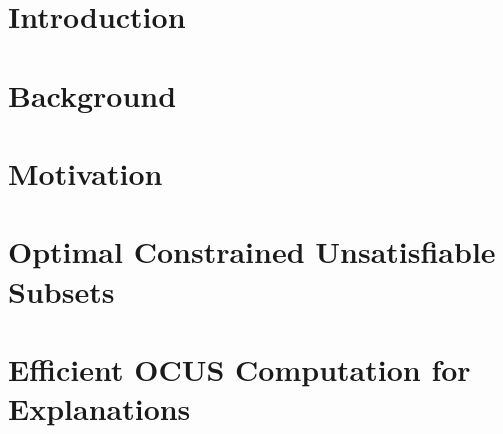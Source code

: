 \documentclass{article}
\newcommand\m[1]{\ensuremath{\mathcal{#1}}}
\newcommand\ignore[1]{}
\newcommand\comment[1]{\marginpar{\parbox{\marginparwidth}{\tiny #1}}}
\renewcommand\comment[1]{#1}
\newcommand{\todo}[1]{{\comment{\color{red}\textsc{TODO:}#1} }}
\newcommand\F{\ensuremath{\m{F} }\xspace}
\newcommand\formula{\ensuremath{\m{F} }\xspace}
\newcommand\mm[1]{\ensuremath{#1}\xspace}
\newcommand\call[1]{\mm{\textsc{#1}}}
\newcommand\sat{\mm{\call{sat}}}
\newcommand\grow{\mm{\call{Grow}}}
\newcommand\comus{\mm{\call{OCUS}}}
\begin{document}
\section{Introduction}


\section{Background}\label{sec:backgr}\label{sec:background}


\section{Motivation}\label{sec:motivation}\label{sec:motviation}


\section{Optimal Constrained Unsatisfiable Subsets} \label{sec:ocus}



\section{Efficient OCUS Computation for Explanations}\label{sec:ocusEx}




\ignore{
    \section{Implementation considerations}\label{sec:impl}
    \todo{REMOVE}
    REMOVE
    When we check the satisfiability of a set $\F'$ we initialise the polarity of the literals to $I_{end}$. We use assumptions to keep the solver warm across different sets $\F'$.

    The implementation of \grow can be achieved in different ways.
    In our algorithms we use the model found by the $\sat(\F')$ call and let a MaxSAT solver complete it to a full assignment over $\F$. Our custom implementations of a greedy grow were consistently outperformed by the MaxSAT call. We believe this is because typically only a fraction of literals of $\F$ are left unassigned in the model of $\F'$ and a MaxSAT solver has highly optimized data-structures to manage $\F$.  %

    In $\comus$, we keep the MIP solver warm and reuse it across all $\comus$ calls. We only ever add constraints to the solver. To handle the changes in $p$ with respect to literals that cannot be chosen, we enforce this by temporarily setting the objective weight to $+\infty$ for literals.
}
\end{document}
